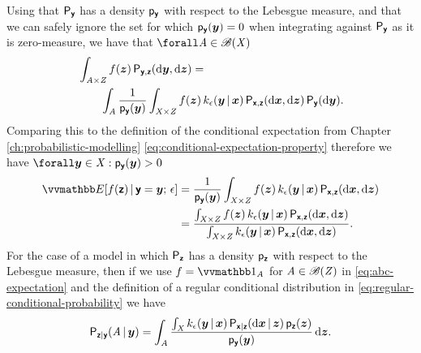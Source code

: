 Using that $\mathsf{P}_{\boldsymbol{\mathsf{y}}}$ has a density $\mathsf{p}_{\boldsymbol{\mathsf{y}}}$ with respect to the Lebesgue measure, and that we can safely ignore the set for which $\mathsf{p}_{\boldsymbol{\mathsf{y}}}(\boldsymbol{y}) = 0$ when integrating against $\mathsf{P}_{\boldsymbol{\mathsf{y}}}$ as it is zero-measure, we have that $\forall \set{A} \in \borel(\set{X})$
\begin{equation}\label{eq:abc-conditional-expectation-derivation-2}
\begin{split}
  &\int_{\mathit{A} \times \mathit{Z}} 
    f(\boldsymbol{z}) 
  \,\mathsf{P}_{\boldsymbol{\mathsf{y}},\boldsymbol{\mathsf{z}}}(\mathrm{d}\boldsymbol{y},\mathrm{d}\boldsymbol{z}) 
  =\,\\
  &\qquad
  \int_{\mathit{A}} \frac{1}{\mathsf{p}_{\boldsymbol{\mathsf{y}}}(\boldsymbol{y})}
  \int_{\mathit{X}\times\mathit{Z}}
    f(\boldsymbol{z})\,k_{\epsilon}(\boldsymbol{y}\operatorname{|}\boldsymbol{x})
  \,\mathsf{P}_{\boldsymbol{\mathsf{x}},\boldsymbol{\mathsf{z}}}(\mathrm{d}\boldsymbol{x},\mathrm{d}\boldsymbol{z})\,\mathsf{P}_{\boldsymbol{\mathsf{y}}}(\mathrm{d}\boldsymbol{y}).
\end{split}
\end{equation}
Comparing this to the definition of the conditional expectation from Chapter \ref{ch:probabilistic-modelling} \eqref{eq:conditional-expectation-property} therefore we have $\forall \vct{y} \in \set{X} : \pden{\rvct{y}}(\vct{y}) > 0$
\begin{equation}
  \label{eq:abc-expectation}
\begin{split}
  \expc{f(\rvct{z}) \gvn \rvct{y} = \vct{y};\,\epsilon} 
  &=
  \frac{1}{\pden{\rvct{y}}(\vct{y})}
  \int_{\set{X}\times\set{Z}}
    f(\vct{z})\,k_{\epsilon}(\vct{y}\gvn\vct{x})
  \,\prob{\rvct{x},\rvct{z}}(\dr\vct{x},\dr\vct{z})
  \\
  &=
  \frac{
  \int_{\set{X}\times\set{Z}}
    f(\vct{z})\,k_{\epsilon}(\vct{y}\gvn\vct{x})
  \,\prob{\rvct{x},\rvct{z}}(\dr\vct{x},\dr\vct{z})
  }
  {
  \int_{\set{X}\times\set{Z}}
    k_\epsilon(\vct{y}\gvn\vct{x})\,
  \prob{\rvct{x},\rvct{z}}(\dr\vct{x},\dr\vct{z})
  }.
\end{split}
\end{equation}
For the case of a model in which $\mathsf{P}_{\boldsymbol{\mathsf{z}}}$ has a density $\mathsf{p}_{\boldsymbol{\mathsf{z}}}$ with respect to the Lebesgue measure, then if we use $f = \ind{\set{A}}$ for $\mathit{A} \in \mathscr{B}(\mathit{Z})$ in \eqref{eq:abc-expectation} and the definition of a regular conditional distribution in \eqref{eq:regular-conditional-probability} we have
\begin{equation}\label{eq:abc-posterior-derivation}
  \mathsf{P}_{\boldsymbol{\mathsf{z}}|\boldsymbol{\mathsf{y}}}(\mathit{A}\operatorname{|}\boldsymbol{y}) = 
  \int_{\mathit{A}} \frac{\int_{\mathit{X}} k_{\epsilon}(\boldsymbol{y}\operatorname{|}\boldsymbol{x}) \,\mathsf{P}_{\boldsymbol{\mathsf{x}}|\boldsymbol{\mathsf{z}}}(\mathrm{d}\boldsymbol{x}\operatorname{|}\boldsymbol{z}) \,\mathsf{p}_{\boldsymbol{\mathsf{z}}}(\boldsymbol{z})}{\mathsf{p}_{\boldsymbol{\mathsf{y}}}(\boldsymbol{y})}\,\mathrm{d}\boldsymbol{z}.
\end{equation}
